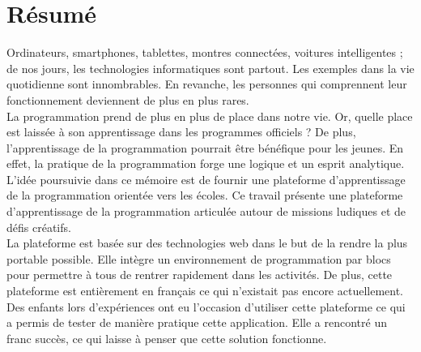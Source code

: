 \section*{Résumé}
Ordinateurs, smartphones, tablettes, montres connectées, voitures intelligentes ; de nos jours, les technologies informatiques sont partout. Les exemples dans la vie quotidienne sont innombrables. En revanche, les personnes qui comprennent leur fonctionnement deviennent de plus en plus rares.\\

La programmation prend de plus en plus de place dans notre vie. Or, quelle place est laissée à son apprentissage dans les programmes officiels ? De plus, l'apprentissage de la programmation pourrait être bénéfique pour les jeunes. En effet, la pratique de la programmation forge une logique et un esprit analytique.\\

L'idée poursuivie dans ce mémoire est de fournir une plateforme d'apprentissage de la programmation orientée vers les écoles. Ce travail présente une plateforme d'apprentissage de la programmation articulée autour de missions ludiques et de défis créatifs.\\

La plateforme est basée sur des technologies web dans le but de la rendre la plus portable possible. Elle intègre un environnement de programmation par blocs pour permettre à tous de rentrer rapidement dans les activités. De plus, cette plateforme est entièrement en français ce qui n'existait pas encore actuellement.\\

Des enfants lors d'expériences ont eu l'occasion d'utiliser cette plateforme ce qui a permis de tester de manière pratique cette application. Elle a rencontré un franc succès, ce qui laisse à penser que cette solution fonctionne.

